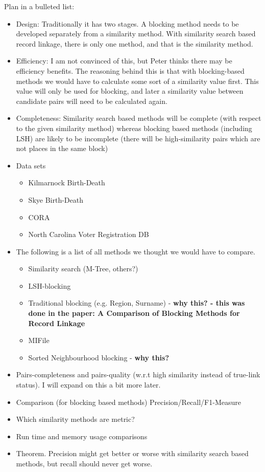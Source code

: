 \documentclass{llncs}
\begin{document}
Plan in a bulleted list:

\begin{itemize}
\item Design: Traditionally it has two stages. A blocking method needs to be developed separately from a similarity method. With similarity search based record linkage, there is only one method, and that is the similarity method.
\item Efficiency: I am not convinced of this, but Peter thinks there may be efficiency benefits. The reasoning behind this is that with blocking-based methods we would have to calculate some sort of a similarity value first. This value will only be used for blocking, and later a similarity value between candidate pairs will need to be calculated again.
\item Completeness: Similarity search based methods will be complete (with respect to the given similarity method) whereas blocking based methods (including LSH) are likely to be incomplete (there will be high-similarity pairs which are not places in the same block)
\item Data sets
\begin{itemize}
\item Kilmarnock Birth-Death
\item Skye Birth-Death
\item CORA
\item North Carolina Voter Registration DB
\end{itemize}
\item The following is a list of all methods we thought we would have to compare.
\begin{itemize}
\item Similarity search (M-Tree, others?)
\item LSH-blocking
\item Traditional blocking (e.g. Region, Surname) - \textbf{why this? - this was done in the paper: A Comparison of Blocking Methods for Record Linkage}
\item MIFile
\item Sorted Neighbourhood blocking - \textbf{why this?}
\end{itemize}
\item Pairs-completeness and pairs-quality (w.r.t high similarity instead of true-link status). I will expand on this a bit more later.
\item Comparison (for blocking based methods)
		Precision/Recall/F1-Measure
\item Which similarity methods are metric?
\item Run time and memory usage comparisons
\item Theorem. Precision might get better or worse with similarity search based methods, but recall should never get worse.
\end{itemize}
\end{document}
